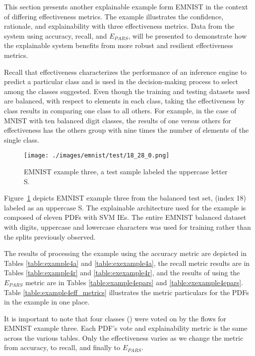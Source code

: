 This section presents another explainable example form EMNIST in the context of
differing effectiveness metrics.  The example illustrates the confidence,
rationale, and explainability with three effectiveness metrics. Data from the
system using accuracy, recall, and $E_{PARS}$, will be presented to demonstrate
how the explainable system benefits from more robust and resilient effectiveness
metrics.

Recall that effectiveness characterizes the performance of an inference engine
to predict a particular class and is used in the decision-making process to
select among the classes suggested. Even though the training and testing
datasets used are balanced, with respect to elements in each class, taking the
effectiveness by class results in comparing one class to all others. For
example, in the case of MNIST with ten balanced digit classes, the results of
one versus others for effectiveness has the others group with nine times the
number of elements of the single class.

\begin{figure}[H]
    \centering
    \texttt{[image: ./images/emnist/test/18\_28\_0.png]}
    \caption{EMNIST example three, a test sample labeled the uppercase letter S.}
    \label{fig:ex4}
\end{figure}

Figure~\ref{fig:ex4} depicts EMNIST example three from the balanced test set,
(index 18) labeled as an uppercase S. The explainable architecture used for the
example is composed of eleven PDFs with SVM IEs. The entire EMNIST balanced
dataset with digits, uppercase and lowercase characters was used for training
rather than the splits previously observed.

The results of processing the example using the accuracy metric are
depicted in Tables \ref{table:example4a} and \ref{table:exexample4a}, the recall
metric results are in Tables \ref{table:example4r} and \ref{table:exexample4r},
and the results of using the $E_{PARS}$ metric are in Tables
\ref{table:example4epars} and \ref{table:exexample4epars}.  Table
\ref{table:example4eff_metrics} illustrates the metric particulars for the PDFs
in the example in one place.

It is important to note that four classes () were voted on by the flows for EMNIST
example three.  Each PDF's vote and explainability metric is the same across the
various tables. Only the effectiveness varies as we change the metric from
accuracy, to recall, and finally to $E_{PARS}$.

